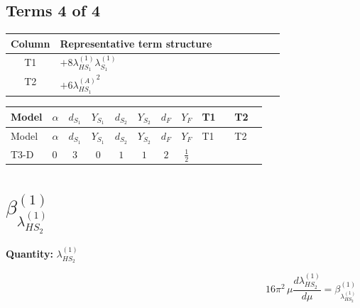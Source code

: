 \documentclass[8pt]{article}
\begin{document}
\begin{landscape}
\subsection*{Terms 4 of 4}
\begin{center}
\begin{tabular}{@{}c >{\raggedright\arraybackslash}p{0.82\linewidth}@{}}
\toprule
Column & Representative term structure \\
\midrule
T1 & \(\displaystyle +8 {\lambda_{HS_1}^{(1)}} {\lambda_{S_1}^{(1)}}\) \\
\midrule
T2 & \(\displaystyle +6 {\lambda_{HS_1}^{(A)}}^2\) \\
\midrule
\bottomrule
\end{tabular}
\end{center}
\smallskip
\tiny
\begin{longtable}{@{}llcccccc >{\raggedright\arraybackslash}p{0.21\linewidth} >{\raggedright\arraybackslash}p{0.21\linewidth}@{}}
\toprule
Model & $\alpha$ & $d_{S_1}$ & $Y_{S_1}$ & $d_{S_2}$ & $Y_{S_2}$ & $d_F$ & $Y_F$ & T1 & T2 \\
\midrule
\endfirsthead
\toprule
Model & $\alpha$ & $d_{S_1}$ & $Y_{S_1}$ & $d_{S_2}$ & $Y_{S_2}$ & $d_F$ & $Y_F$ & T1 & T2 \\
\midrule
\endhead
T3-D & $0$ & $3$ & $0$ & $1$ & $1$ & $2$ & $\frac{1}{2}$ & \scriptsize\adjustbox{max width=\linewidth}{$\begin{gathered} +8 {\lambda_{HS_1}^{(1)}} {\lambda_{S_1}^{(1)}}\end{gathered}$} & \scriptsize\adjustbox{max width=\linewidth}{$\begin{gathered} +6 {\lambda_{HS_1}^{(A)}}^2\end{gathered}$} \\
\midrule
\bottomrule
\end{longtable}
\clearpage
\section*{$\beta_{\lambda_{HS_2}^{(1)}}^{(1)}$}
\noindent\textbf{Quantity: }$\lambda_{HS_2}^{(1)}$\par\smallskip
\[16\pi^2\,\mu\frac{d \lambda_{HS_2}^{(1)}}{d\mu}=\beta_{\lambda_{HS_2}^{(1)}}^{(1)}\]

\end{landscape}
\end{document}
